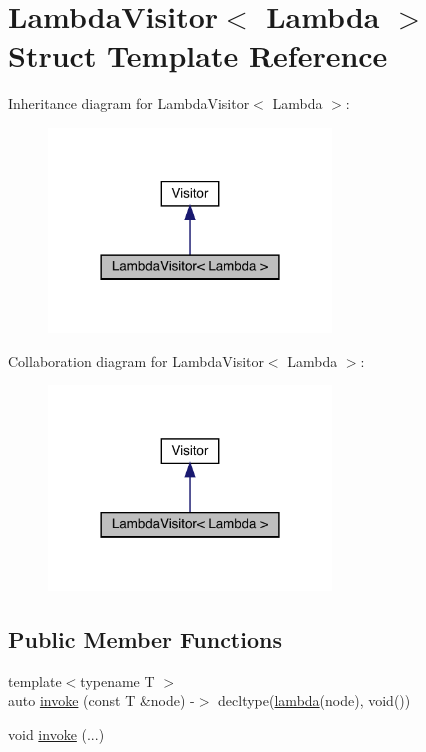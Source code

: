 \hypertarget{struct_lambda_visitor}{}\section{Lambda\+Visitor$<$ Lambda $>$ Struct Template Reference}
\label{struct_lambda_visitor}


Inheritance diagram for Lambda\+Visitor$<$ Lambda $>$\+:
\nopagebreak
\begin{figure}[H]
\begin{center}
\leavevmode
\includegraphics[width=213pt]{struct_lambda_visitor__inherit__graph}
\end{center}
\end{figure}


Collaboration diagram for Lambda\+Visitor$<$ Lambda $>$\+:
\nopagebreak
\begin{figure}[H]
\begin{center}
\leavevmode
\includegraphics[width=213pt]{struct_lambda_visitor__coll__graph}
\end{center}
\end{figure}
\subsection*{Public Member Functions}
\begin{DoxyCompactItemize}
\item 
{\footnotesize template$<$typename T $>$ }\\auto \hyperlink{struct_lambda_visitor_a02b7b65a100c0f548592d1747a2b7ef8}{invoke} (const T \&node) -\/$>$ decltype(\hyperlink{struct_lambda_visitor_a171d971bb3064e3b93c46916f51e4dc2}{lambda}(node), void())
\item 
void \hyperlink{struct_lambda_visitor_ab754a8920cef4d471d217ffe4f7f77f8}{invoke} (...)
\end{DoxyCompactItemize}

